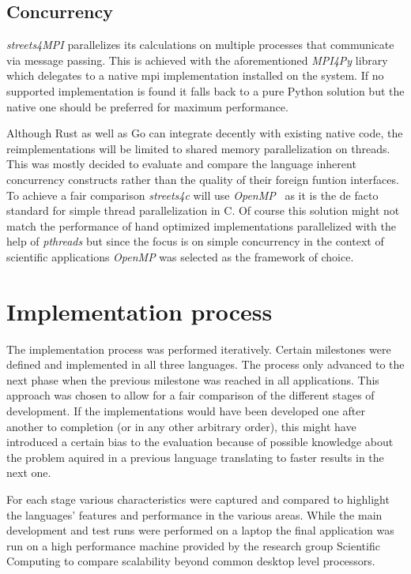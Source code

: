 \subsection*{Concurrency}
\label{subsec:Approach::Differences::Concurrency}

\textit{streets4MPI} parallelizes its calculations on multiple processes that communicate via message passing. This is achieved with the aforementioned \textit{MPI4Py} library which delegates to a native \gls{mpi} implementation installed on the system. If no supported implementation is found it falls back to a pure Python solution but the native one should be preferred for maximum performance.

Although Rust as well as Go can integrate decently with existing native code, the reimplementations will be limited to shared memory parallelization on threads. This was mostly decided to evaluate and compare the language inherent concurrency constructs rather than the quality of their foreign funtion interfaces. To achieve a fair comparison \textit{streets4c} will use \textit{OpenMP}~ as it is the de facto standard for simple thread parallelization in C. Of course this solution might not match the performance of hand optimized implementations parallelized with the help of \textit{pthreads} but since the focus is on simple concurrency in the context of scientific applications \textit{OpenMP} was selected as the framework of choice.

\section{Implementation process}
\label{sec:Approach::Implementation}

The implementation process was performed iteratively. Certain milestones were defined and implemented in all three languages. The process only advanced to the next phase when the previous milestone was reached in all applications. This approach was chosen to allow for a fair comparison of the different stages of development. If the implementations would have been developed one after another to completion (or in any other arbitrary order), this might have introduced a certain bias to the evaluation because of possible knowledge about the problem aquired in a previous language translating to faster results in the next one.

For each stage various characteristics were captured and compared to highlight the languages' features and performance in the various areas. While the main development and test runs were performed on a laptop the final application was run on a high performance machine provided by the research group Scientific Computing to compare scalability beyond common desktop level processors.

